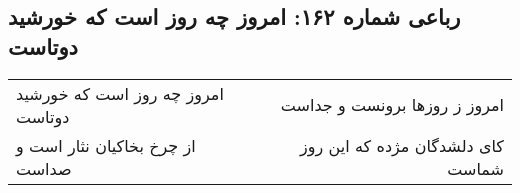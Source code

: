 \begin{center}
\section*{رباعی شماره ۱۶۲: امروز چه روز است که خورشید دوتاست}
\label{sec:0162}
\begin{longtable}{l p{0.5cm} r}
امروز چه روز است که خورشید دوتاست
&&
امروز ز روزها برونست و جداست
\\
از چرخ بخاکیان نثار است و صداست
&&
کای دلشدگان مژده که این روز شماست
\\
\end{longtable}
\end{center}

